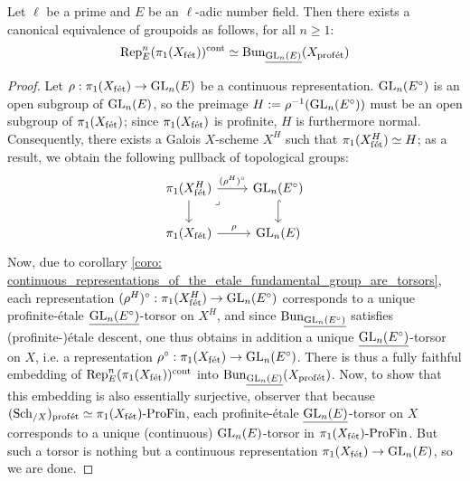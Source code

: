         \begin{proposition} \label{prop: ell_adic_representations_are_ell_adic_torsors}
            Let $\ell$ be a prime and $E$ be an $\ell$-adic number field. Then there exists a canonical equivalence of groupoids as follows, for all $n \geq 1$:
                $$\mathrm{Rep}_E^n(\pi_1(X_{\mathrm{f\acute{e}t}}))^{\mathrm{cont}} \simeq \mathrm{Bun}_{\underline{\operatorname{GL}_n(E)}}(X_{\mathrm{prof\acute{e}t}})$$
        \end{proposition}
            \begin{proof}
                Let $\rho: \pi_1(X_{\mathrm{f\acute{e}t}}) \to \operatorname{GL}_n(E)$ be a continuous representation. $\operatorname{GL}_n(E^{\circ})$ is an open subgroup of $\operatorname{GL}_n(E)$, so the preimage $H := \rho^{-1}(\operatorname{GL}_n(E^{\circ}))$ must be an open subgroup of $\pi_1(X_{\mathrm{f\acute{e}t}})$; since $\pi_1(X_{\mathrm{f\acute{e}t}})$ is profinite, $H$ is furthermore normal. Consequently, there exists a Galois $X$-scheme $X^H$ such that $\pi_1(X^H_{\mathrm{f\acute{e}t}}) \simeq H$; as a result, we obtain the following pullback of topological groups:
                    $$
                        \begin{tikzcd}
                        	{\pi_1(X^H_{\fet})} & {\GL_n(E^{\circ})} \\
                        	{\pi_1(X_{\fet})} & {\GL_n(E)}
                        	\arrow[hook, from=1-2, to=2-2]
                        	\arrow["\rho", from=2-1, to=2-2]
                        	\arrow[from=1-1, to=2-1]
                        	\arrow["{(\rho^H)^{\circ}}", from=1-1, to=1-2]
                        	\arrow["\lrcorner"{anchor=center, pos=0.125}, draw=none, from=1-1, to=2-2]
                        \end{tikzcd}
                    $$
                Now, due to corollary \ref{coro: continuous_representations_of_the_etale_fundamental_group_are_torsors}, each representation $(\rho^H)^{\circ}: \pi_1(X^H_{\mathrm{f\acute{e}t}}) \to \operatorname{GL}_n(E^{\circ})$ corresponds to a unique profinite-\'etale $\underline{\operatorname{GL}_n(E^{\circ})}$-torsor on $X^H$, and since $\mathrm{Bun}_{\underline{\operatorname{GL}_n(E^{\circ})}}$ satisfies (profinite-)\'etale descent, one thus obtains in addition a unique $\underline{\operatorname{GL}_n(E^{\circ})}$-torsor on $X$, i.e. a representation $\rho^{\circ}: \pi_1(X_{\mathrm{f\acute{e}t}}) \to \operatorname{GL}_n(E^{\circ})$. There is thus a fully faithful embedding of $\mathrm{Rep}_E^n(\pi_1(X_{\mathrm{f\acute{e}t}}))^{\mathrm{cont}}$ into $\mathrm{Bun}_{\underline{\operatorname{GL}_n(E)}}(X_{\mathrm{prof\acute{e}t}})$. Now, to show that this embedding is also essentially surjective, observer that because $(\mathrm{Sch}_{/X})_{\mathrm{prof\acute{e}t}} \simeq \pi_1(X_{\mathrm{f\acute{e}t}})\text{-}\mathrm{Pro}\mathrm{Fin}$, each profinite-\'etale $\underline{\operatorname{GL}_n(E)}$-torsor on $X$ corresponds to a unique (continuous) $\operatorname{GL}_n(E)$-torsor in $\pi_1(X_{\mathrm{f\acute{e}t}})\text{-}\mathrm{Pro}\mathrm{Fin}$. But such a torsor is nothing but a continuous representation $\pi_1(X_{\mathrm{f\acute{e}t}}) \to \operatorname{GL}_n(E)$, so we are done.
            \end{proof}
